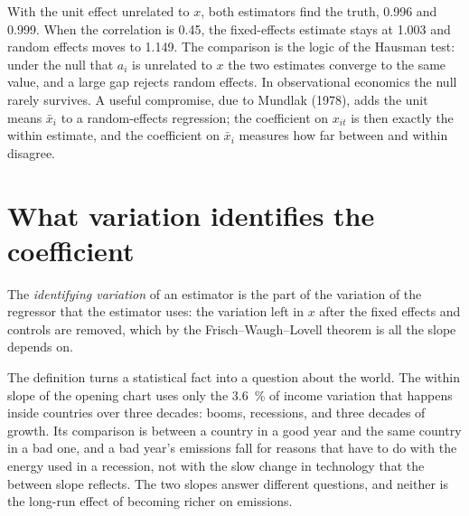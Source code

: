 \label{lst:b3:panel-data:re}

\label{out:b3:panel-data:re}

With the unit effect unrelated to $x$, both estimators find the truth, 0.996
and 0.999. When the correlation is 0.45, the fixed-effects estimate stays at
1.003 and random effects moves to 1.149. %
The comparison is the logic of the Hausman test: under the null that $a_i$ is
unrelated to $x$ the two estimates converge to the same value, and a large
gap rejects random effects. In observational economics the null rarely
survives. A useful compromise, due to Mundlak (1978), adds the unit means
$\bar x_i$ to a random-effects regression; the coefficient on $x_{it}$ is then
exactly the within estimate, and the coefficient on $\bar x_i$ measures how
far between and within disagree.

\section{What variation identifies the coefficient}\label{sec:b3:panel-data:identifying}

\begin{definition}\label{def:b3:panel-data:identifying-variation}
The \emph{identifying variation} of an estimator is the part of the variation
of the regressor that the estimator uses: the variation left in $x$ after the
fixed effects and controls are removed, which by the Frisch--Waugh--Lovell
theorem is all the slope depends on.
\end{definition}

The definition turns a statistical fact into a question about the world. The
within slope of the opening chart uses only the 3.6~\% of income variation that
happens inside countries over three decades: %
booms, recessions, and three decades of growth. Its comparison is between a
country in a good year and the same country in a bad one, and a bad year's
emissions fall for reasons that have to do with the energy used in a recession,
not with the slow change in technology that the between slope reflects. The two
slopes answer different questions, and neither is the long-run effect of
becoming richer on emissions.

